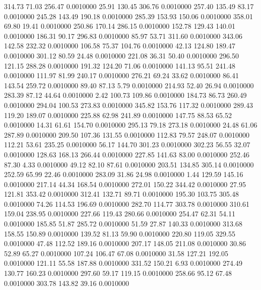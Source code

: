  314.73   71.03  256.47   0.0010000
  25.91  130.45  306.76   0.0010000
 257.40  135.49   83.17   0.0010000
 245.28  143.49  190.18   0.0010000
 285.39  153.93  150.06   0.0010000
 358.01   69.80   19.41   0.0010000
 250.86  170.14  286.15   0.0010000
 152.78  129.43  140.01   0.0010000
 186.31   90.17  296.83   0.0010000
  85.97   53.71  311.60   0.0010000
 343.06  142.58  232.32   0.0010000
 106.58   75.37  104.76   0.0010000
  42.13  124.80  189.47   0.0010000
 301.12   80.59   24.48   0.0010000
 221.08   36.31   50.40   0.0010000
 296.50  121.15  288.28   0.0010000
 191.32  124.20   71.06   0.0010000
 141.13   95.51  241.48   0.0010000
 111.97   81.99  240.17   0.0010000
 276.21   69.24   33.62   0.0010000
  86.41  143.54  259.72   0.0010000
  89.40   87.13    5.79   0.0010000
 214.93   52.40   26.94   0.0010000
 283.39   87.12   44.64   0.0010000
   2.42  100.73  109.86   0.0010000
 184.73   86.73  260.49   0.0010000
 294.04  100.53  273.83   0.0010000
 345.82  153.76  117.32   0.0010000
 289.43  119.20  189.07   0.0010000
 225.88   62.98  241.89   0.0010000
 147.75   88.53   65.52   0.0010000
  14.31   61.61  154.70   0.0010000
 295.13   79.18  273.18   0.0010000
  24.48   61.06  287.89   0.0010000
 209.50  107.36  131.55   0.0010000
 112.83   79.57  248.07   0.0010000
 112.21   53.61  235.25   0.0010000
  56.17  144.70  301.23   0.0010000
 302.23   56.55   32.07   0.0010000
 128.63  168.13  266.44   0.0010000
 227.85  141.63   83.00   0.0010000
 252.46   87.30    4.33   0.0010000
  49.12   82.10   87.61   0.0010000
 203.51  134.85  305.14   0.0010000
 252.59   65.99   22.46   0.0010000
 283.09   31.86   24.98   0.0010000
   1.44  129.59  145.16   0.0010000
 217.14   44.34  168.54   0.0010000
 272.01  150.22  344.42   0.0010000
  27.95  121.81  353.42   0.0010000
 312.41  132.71   89.71   0.0010000
 195.30  103.75  305.48   0.0010000
  74.26  114.53  196.69   0.0010000
 282.70  114.77  303.78   0.0010000
 310.61  159.04  238.95   0.0010000
 227.66  119.43  280.66   0.0010000
 254.47   62.31   54.11   0.0010000
 185.85   51.87  285.72   0.0010000
  51.59   27.87  140.33   0.0010000
 313.68  158.55  150.89   0.0010000
 139.52   81.13   59.90   0.0010000
 220.80  119.05  329.55   0.0010000
  47.48  112.52  189.16   0.0010000
 207.17  148.05  211.08   0.0010000
  30.86   52.89   65.27   0.0010000
 107.24  106.47   67.08   0.0010000
  31.58  127.21  192.05   0.0010000
 121.11   55.58  187.88   0.0010000
 331.52  150.21    6.93   0.0010000
 274.49  130.77  160.23   0.0010000
 297.60   59.17  119.15   0.0010000
 258.66   95.12   67.48   0.0010000
 303.78  143.82   39.16   0.0010000
